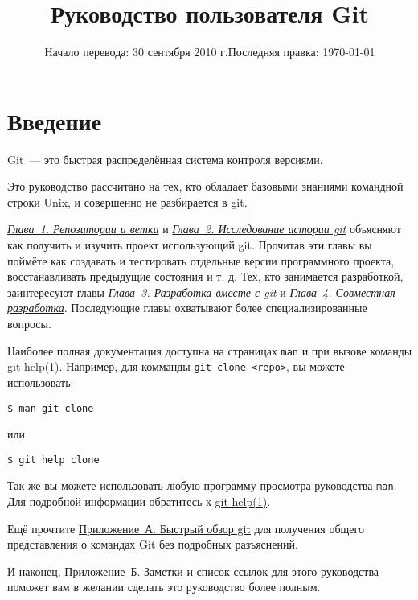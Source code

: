 \documentclass[12pt]{scrreprt}
\title{Руководство пользователя Git}
\date{Начало перевода: 30 сентября 2010 г.\linebreak Последняя правка: \today}
\begin{document}
\maketitle
\tableofcontents
\frenchspacing
%
%
\hypertarget{preface}{}\chapter{Введение}
Git~--- это быстрая распределённая система контроля версиями.

Это руководство рассчитано на тех, кто обладает базовыми знаниями командной
строки Unix, и совершенно не разбирается в git.

\href{#chapter1}{\emph{Глава~1. Репозитории и ветки}} и 
\href{#chapter2}{\emph{Глава~2. Исследование истории git}} объясняют как 
получить и изучить проект использующий git. Прочитав эти главы вы поймёте как 
создавать и тестировать отдельные версии программного проекта, восстанавливать 
предыдущие состояния и т. д. Тех, кто занимается разработкой, заинтересуют главы
\href{#chapter3}{\emph{Глава~3. Разработка вместе с git}} и 
\href{#chapter4}{\emph{Глава~4. Совместная разработка}}. После\-дующие главы 
охватывают более специализированные вопросы.

Наиболее полная документация доступна на страницах \verb|man| и при вызове
команды \href{http://www.kernel.org/pub/software/scm/git/docs/git-help.html}
{git-help(1)}. Например, для комманды \verb|git clone <repo>|, вы 
можете использовать:

\begin{verbatim}
$ man git-clone
\end{verbatim}

или

\begin{verbatim}
$ git help clone
\end{verbatim}

Так же вы можете использовать любую программу просмотра руководства
\verb|man|.
Для подробной информации обратитесь к 
\href{http://www.kernel.org/pub/software/scm/git/docs/git-help.html}
{git-help(1)}.

Ещё прочтите \href{#appendixa}{Приложение~А. Быстрый обзор git} для получения
общего представления о командах Git без подробных разъяснений.

И наконец, \href{#appendixb}{Приложение~Б. Заметки и список ссылок для этого
руководства} поможет вам в желании сделать это руководство более
полным.
%
%
\end{document}
